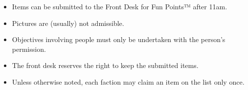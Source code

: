 \begin{itemize}[leftmargin=*, itemsep=-0.7\baselineskip]
\item Items can be submitted to the Front Desk for Fun Points™ after 11am.
\item Pictures are (usually) not admissible.
\item Objectives involving people must only be undertaken with the
  person’s permission.
\item The front desk reserves the right to keep the submitted items.
\item Unless otherwise noted, each faction may claim an item on the
  list only once.
\end{itemize}


